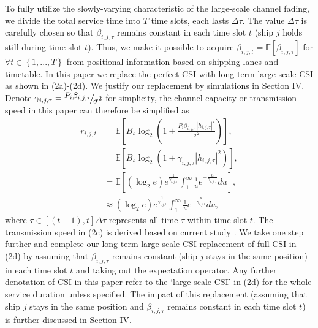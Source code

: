 \documentclass[conference]{IEEEtran}
\begin{document}
To fully utilize the slowly-varying characteristic of the large-scale channel fading, we divide the total service time into $T$ time slots, each lasts $\Delta \tau$. The value $\Delta \tau$ is carefully chosen so that $\beta _{i,j,\tau }$ remains constant in each time slot $t$ (ship $j$ holds still during time slot $t$). Thus, we make it possible to acquire $\beta _{i,j,t} = \mathbb{E} \left [ {\beta _{i,j,\tau }} \right ]$ for $\forall t \in \left\{ {1,...,T} \right\}$ from positional information based on shipping-lanes and timetable. 
In this paper we replace the perfect CSI with long-term large-scale CSI as shown in (2a)-(2d). We justify our replacement by simulations in Section IV. Denote ${\gamma _{i,j,\tau }} = {\raise0.7ex\hbox{${{P_{i} }{\beta _{i,j,\tau }}}$} \!\mathord{\left/
 {\vphantom {{{P_{i} }{\beta _{i,j,\tau }}} {{\sigma ^2}}}}\right.\kern-\nulldelimiterspace}
\!\lower0.7ex\hbox{${{\sigma ^2}}$}}$ for simplicity, the channel capacity or transmission speed in this paper can therefore be simplified as
\begin{subequations}
\begin{align}
{r_{i,j,t}} & = {\mathbb{E}}\left [ {{B_s}{{\log }_2}\left( {1 + \frac{{{P_{i} }{\beta _{i,j,\tau }}{{\left| {{h_{i,j,\tau }}} \right|}^2}}}{{{\sigma ^2}}}} \right)} \right ] ,\\
& = {\mathbb{E}}\left [  {B_s}{\log }_2 \left( {1 + {\gamma _{i,j,\tau }}{{\left| {{h_{i,j,\tau }}} \right|}^2}} \right)  \right ] ,\\
& = {\mathbb{E}}\left [  \left( {{{\log }_2}e} \right){e^{\frac{1}{{{\gamma _{i,j,\tau }}}}}}\int_1^\infty  {\frac{1}{u}{e^{ - \frac{u}{{{\gamma _{i,j,\tau }}}}}}du} \right ] ,\\
&  \approx \left( {{{\log }_2}e} \right){e^{\frac{1}{{{\gamma _{i,j,t}}}}}}\int_1^\infty  {\frac{1}{u}{e^{ - \frac{u}{{{\gamma _{i,j,t}}}}}}du} ,
\end{align}
\end{subequations}
where $\tau  \in \left[ {\left( {t - 1} \right),t} \right]\Delta \tau$ represents all time $\tau $ within time slot $t$. 
The transmission speed in (2c) is derived based on current study \cite{p41}. We take one step further and complete our long-term large-scale CSI replacement of full CSI in (2d) by assuming that $\beta _{i,j,\tau }$ remains constant (ship $j$ stays in the same position) in each time slot $t$ and taking out the expectation operator. Any further denotation of CSI in this paper refer to the `large-scale CSI' in (2d) for the whole service duration unless specified. The impact of this replacement (assuming that ship $j$ stays in the same position and $\beta _{i,j,\tau }$ remains constant in each time slot $t$) is further discussed in Section IV. 
\end{document}
